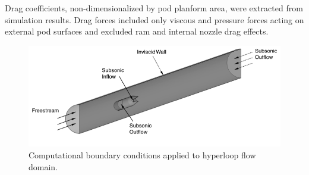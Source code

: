 	Drag coefficients, non-dimensionalized by pod planform area,
	were extracted from simulation results.
	Drag forces included only viscous and pressure forces acting on external
	pod surfaces and excluded ram and internal nozzle drag effects.


	\begin{figure}
		\centering
		\includegraphics[width=.75\textwidth]{../../images/CFDmodel.png}
		\caption{Computational boundary conditions applied to hyperloop flow domain.}
		\label{fig:CFDmodel}
	\end{figure}

